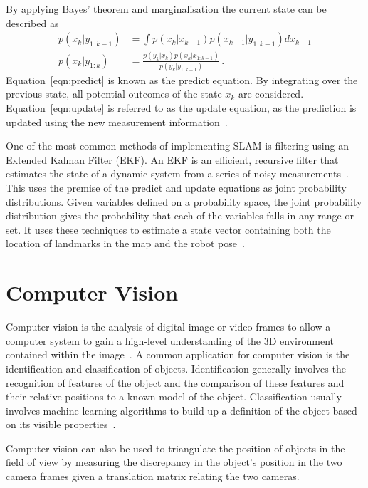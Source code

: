 By applying Bayes' theorem and marginalisation the current state can be described as
\begin{align}
\label{eqn:predict}
p(x_{k} | y_{1:k-1}) & = \int p(x_{k}|x_{k-1}) p(x_{k-1} | y_{1:k-1}) dx_{k-1} \\
\label{eqn:update}
p(x_{k} | y_{1:k}) &= \frac{ p(y_{k}|x_{k})p(x_{k}|x_{1:k-1})}{ p(y_{k}|y_{1:k-1})}\,.
\end{align}
Equation~\ref{eqn:predict} is known as the predict equation. By integrating over
the previous state, all potential outcomes of the state $x_k$ are
considered. Equation~\ref{eqn:update} is referred to as the update equation,
as the prediction is updated using the new measurement information~\cite{kam1997sensorfusion}.

One of the most common methods of implementing SLAM is filtering using an
Extended Kalman Filter (EKF). An EKF is an efficient, recursive filter
that estimates the state of a dynamic system from a series of noisy measurements~\cite{fox2003bayesian}.
This uses the premise of the predict and update equations as joint probability
distributions. Given variables defined on a probability space, the joint
probability distribution gives the probability that each of the variables falls in any
range or set. It uses these techniques to estimate a state vector containing
both the location of landmarks in the map and the robot pose~\cite{huang2007convergence}.


\section{Computer Vision}\label{litreview/cv}
Computer vision is the analysis of digital image or video frames to allow a computer
system to gain a high-level understanding of the 3D environment contained within
the image~\cite{CVBallard}. A common application for computer vision is the identification and classification
of objects. Identification generally involves the recognition of features of the
object and the comparison of these features and their relative positions to a
known model of the object. Classification usually involves machine learning
algorithms to build up a definition of the object based on its visible properties~\cite{CVpaoletti2018new}.

Computer vision can also be used to triangulate the position of objects in the
field of view by measuring the discrepancy in the object's position in the two camera
frames given a translation matrix relating the two cameras.

